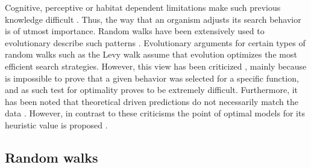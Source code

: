 \documentclass[11pt]{article}
\begin{document}
Cognitive, perceptive or habitat dependent limitations make such previous
knowledge difficult \citep{bartumeusOptimalSearchBehavior2009a}. Thus, the way
that an organism adjusts its search behavior is of utmost importance. Random
walks have been extensively used to evolutionary describe such patterns
\citep{bartumeusOptimalSearchBehavior2009a,fioritiLevyForagingDynamic2015,humphriesForagingSuccessBiological2012,jagerHowSuperdiffusionGets2013}.
Evolutionary arguments for certain types of random walks such as the Levy walk
\citep{wosniackEvolutionaryOriginsLevy2017} assume that evolution optimizes the
most efficient search strategies. However, this view has been criticized
\citep{pierceEightReasonsWhy1987}, mainly because is impossible to prove that a
given behavior was selected for a specific function, and as such test for
optimality proves to be extremely difficult. Furthermore, it has been noted that
theoretical driven predictions do not necessarily match the data
\citep{pierceEightReasonsWhy1987}. However, in contrast to these criticisms the
point of optimal models for its heuristic value is proposed
\citep{parkerOptimalityTheoryEvolutionary1990}.

\subsection{Random walks}
\label{sec:orge042878}
\end{document}
